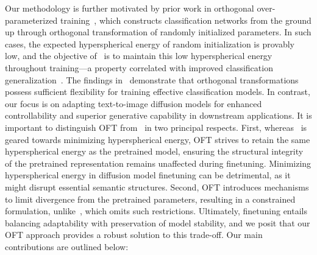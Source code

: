 Our methodology is further motivated by prior work in orthogonal over-parameterized training~\cite{liu2021orthogonal}, which constructs classification networks from the ground up through orthogonal transformation of randomly initialized parameters. In such cases, the expected hyperspherical energy of random initialization is provably low, and the objective of~\cite{liu2021orthogonal} is to maintain this low hyperspherical energy throughout training—a property correlated with improved classification generalization~\cite{liu2018learning,lin2020regularizing}. The findings in~\cite{liu2021orthogonal} demonstrate that orthogonal transformations possess sufficient flexibility for training effective classification models. In contrast, our focus is on adapting text-to-image diffusion models for enhanced controllability and superior generative capability in downstream applications. It is important to distinguish OFT from~\cite{liu2021orthogonal} in two principal respects. First, whereas~\cite{liu2021orthogonal} is geared towards minimizing hyperspherical energy, OFT strives to retain the same hyperspherical energy as the pretrained model, ensuring the structural integrity of the pretrained representation remains unaffected during finetuning. Minimizing hyperspherical energy in diffusion model finetuning can be detrimental, as it might disrupt essential semantic structures. Second, OFT introduces mechanisms to limit divergence from the pretrained parameters, resulting in a constrained formulation, unlike~\cite{liu2021orthogonal}, which omits such restrictions. Ultimately, finetuning entails balancing adaptability with preservation of model stability, and we posit that our OFT approach provides a robust solution to this trade-off. Our main contributions are outlined below:

